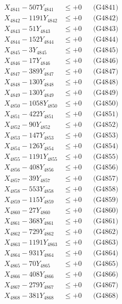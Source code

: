 \documentclass[a4paper,10pt]{article}
\begin{document}
{\begin{align}
\allowbreak
X_{4841} - 507Y_{4841} &\leq +0 && \text{(G4841)} \\
X_{4842} - 1191Y_{4842} &\leq +0 && \text{(G4842)} \\
X_{4843} - 51Y_{4843} &\leq +0 && \text{(G4843)} \\
X_{4844} - 152Y_{4844} &\leq +0 && \text{(G4844)} \\
X_{4845} - 3Y_{4845} &\leq +0 && \text{(G4845)} \\
X_{4846} - 17Y_{4846} &\leq +0 && \text{(G4846)} \\
X_{4847} - 389Y_{4847} &\leq +0 && \text{(G4847)} \\
X_{4848} - 130Y_{4848} &\leq +0 && \text{(G4848)} \\
X_{4849} - 130Y_{4849} &\leq +0 && \text{(G4849)} \\
X_{4850} - 1058Y_{4850} &\leq +0 && \text{(G4850)} \\
\allowbreak
X_{4851} - 422Y_{4851} &\leq +0 && \text{(G4851)} \\
X_{4852} - 90Y_{4852} &\leq +0 && \text{(G4852)} \\
X_{4853} - 147Y_{4853} &\leq +0 && \text{(G4853)} \\
X_{4854} - 126Y_{4854} &\leq +0 && \text{(G4854)} \\
X_{4855} - 1191Y_{4855} &\leq +0 && \text{(G4855)} \\
X_{4856} - 408Y_{4856} &\leq +0 && \text{(G4856)} \\
X_{4857} - 39Y_{4857} &\leq +0 && \text{(G4857)} \\
X_{4858} - 553Y_{4858} &\leq +0 && \text{(G4858)} \\
X_{4859} - 115Y_{4859} &\leq +0 && \text{(G4859)} \\
X_{4860} - 27Y_{4860} &\leq +0 && \text{(G4860)} \\
\allowbreak
X_{4861} - 368Y_{4861} &\leq +0 && \text{(G4861)} \\
X_{4862} - 729Y_{4862} &\leq +0 && \text{(G4862)} \\
X_{4863} - 1191Y_{4863} &\leq +0 && \text{(G4863)} \\
X_{4864} - 931Y_{4864} &\leq +0 && \text{(G4864)} \\
X_{4865} - 70Y_{4865} &\leq +0 && \text{(G4865)} \\
X_{4866} - 408Y_{4866} &\leq +0 && \text{(G4866)} \\
X_{4867} - 279Y_{4867} &\leq +0 && \text{(G4867)} \\
X_{4868} - 381Y_{4868} &\leq +0 && \text{(G4868)} \\

\end{align}}
\end{document}
